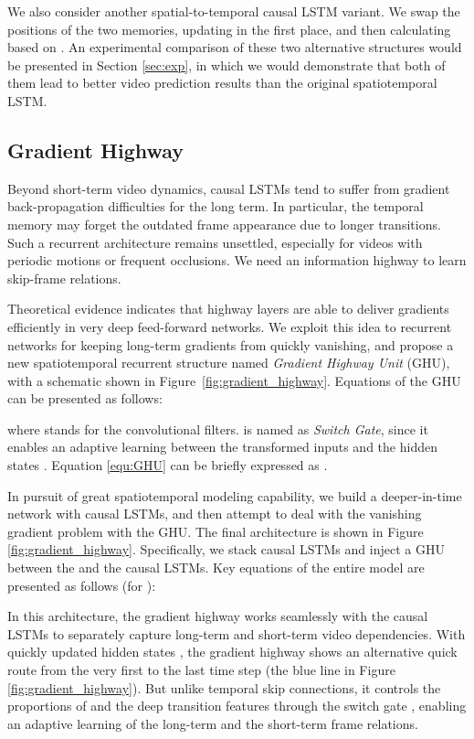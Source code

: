 \documentclass{article}
\begin{document}
We also consider another spatial-to-temporal causal LSTM variant. We swap the positions of the two memories, updating  in the first place, and then calculating  based on . An experimental comparison of these two alternative structures would be presented in Section \ref{sec:exp}, in which we would demonstrate that both of them lead to better video prediction results than the original spatiotemporal LSTM.




\subsection{Gradient Highway}


Beyond short-term video dynamics, causal LSTMs tend to suffer from gradient back-propagation difficulties for the long term. In particular, the temporal memory  may forget the outdated frame appearance due to longer transitions. Such a recurrent architecture remains unsettled, especially for videos with periodic motions or frequent occlusions. We need an information highway to learn skip-frame relations. 

Theoretical evidence indicates that highway layers \cite{srivastava2015training} are able to deliver gradients efficiently in very deep feed-forward networks. We exploit this idea to recurrent networks for keeping long-term gradients from quickly vanishing, and propose a new spatiotemporal recurrent structure named \textit{Gradient Highway Unit} (GHU), with a schematic shown in Figure~\ref{fig:gradient_highway}. Equations of the GHU can be presented as follows: 



where  stands for the convolutional filters.  is named as \textit{Switch Gate}, since it enables an adaptive learning between the transformed inputs  and the hidden states . Equation \ref{equ:GHU} can be briefly expressed as .




In pursuit of great spatiotemporal modeling capability, we build a deeper-in-time network with causal LSTMs, and then attempt to deal with the vanishing gradient problem with the GHU. The final architecture is shown in Figure \ref{fig:gradient_highway}. Specifically, we stack  causal LSTMs  and inject a GHU between the  and the  causal LSTMs. Key equations of the entire model are presented as follows (for ):





In this architecture, the gradient highway works seamlessly with the causal LSTMs to separately capture long-term and short-term video dependencies. With quickly updated hidden states , the gradient highway shows an alternative quick route from the very first to the last time step (the blue line in Figure \ref{fig:gradient_highway}). But unlike temporal skip connections, it controls the proportions of  and the deep transition features  through the switch gate , enabling an adaptive learning of the long-term and the short-term frame relations. 
\end{document}
